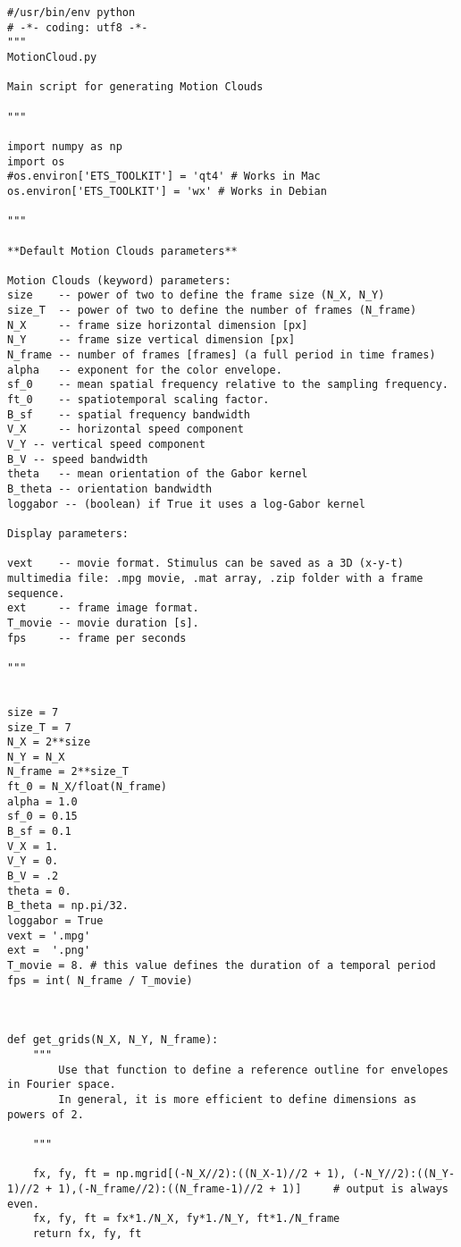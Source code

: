 \documentclass[a4paper,11pt]{article}%
\begin{document}
\begin{lstlisting}
#/usr/bin/env python
# -*- coding: utf8 -*-
"""
MotionCloud.py

Main script for generating Motion Clouds

"""

import numpy as np
import os
#os.environ['ETS_TOOLKIT'] = 'qt4' # Works in Mac
os.environ['ETS_TOOLKIT'] = 'wx' # Works in Debian

"""

**Default Motion Clouds parameters**

Motion Clouds (keyword) parameters:
size   	-- power of two to define the frame size (N_X, N_Y)
size_T 	-- power of two to define the number of frames (N_frame)
N_X 	-- frame size horizontal dimension [px]
N_Y 	-- frame size vertical dimension [px]
N_frame -- number of frames [frames] (a full period in time frames)
alpha 	-- exponent for the color envelope.
sf_0	-- mean spatial frequency relative to the sampling frequency.
ft_0 	-- spatiotemporal scaling factor. 
B_sf 	-- spatial frequency bandwidth
V_X 	-- horizontal speed component
V_Y	-- vertical speed component
B_V	-- speed bandwidth
theta	-- mean orientation of the Gabor kernel
B_theta -- orientation bandwidth
loggabor -- (boolean) if True it uses a log-Gabor kernel 

Display parameters:

vext   	-- movie format. Stimulus can be saved as a 3D (x-y-t) multimedia file: .mpg movie, .mat array, .zip folder with a frame sequence. 	
ext    	-- frame image format.
T_movie -- movie duration [s].
fps  	-- frame per seconds

"""


size = 7
size_T = 7
N_X = 2**size 
N_Y = N_X
N_frame = 2**size_T
ft_0 = N_X/float(N_frame)
alpha = 1.0 
sf_0 = 0.15 
B_sf = 0.1
V_X = 1.
V_Y = 0.
B_V = .2
theta = 0.
B_theta = np.pi/32.
loggabor = True
vext = '.mpg'
ext =  '.png'
T_movie = 8. # this value defines the duration of a temporal period
fps = int( N_frame / T_movie)



def get_grids(N_X, N_Y, N_frame):
    """
        Use that function to define a reference outline for envelopes in Fourier space.
        In general, it is more efficient to define dimensions as powers of 2.

    """
    
    fx, fy, ft = np.mgrid[(-N_X//2):((N_X-1)//2 + 1), (-N_Y//2):((N_Y-1)//2 + 1),(-N_frame//2):((N_frame-1)//2 + 1)]     # output is always even.
    fx, fy, ft = fx*1./N_X, fy*1./N_Y, ft*1./N_frame
    return fx, fy, ft


\end{lstlisting}
\end{document}
